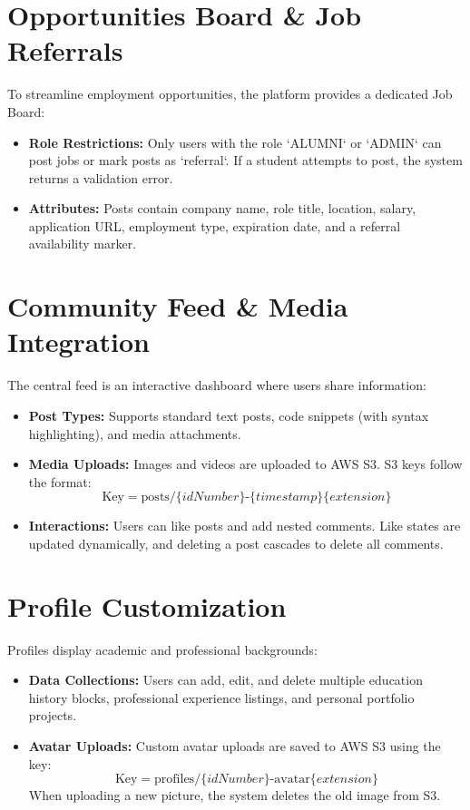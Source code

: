 \section{Opportunities Board \& Job Referrals}
To streamline employment opportunities, the platform provides a dedicated Job Board:
\begin{itemize}
    \item \textbf{Role Restrictions:} Only users with the role `ALUMNI` or `ADMIN` can post jobs or mark posts as `referral`. If a student attempts to post, the system returns a validation error.
    \item \textbf{Attributes:} Posts contain company name, role title, location, salary, application URL, employment type, expiration date, and a referral availability marker.
\end{itemize}

\section{Community Feed \& Media Integration}
The central feed is an interactive dashboard where users share information:
\begin{itemize}
    \item \textbf{Post Types:} Supports standard text posts, code snippets (with syntax highlighting), and media attachments.
    \item \textbf{Media Uploads:} Images and videos are uploaded to AWS S3. S3 keys follow the format:
    \begin{equation}
        \text{Key} = \text{posts/}\{idNumber\}\text{-}\{timestamp\}\{extension\}
    \end{equation}
    \item \textbf{Interactions:} Users can like posts and add nested comments. Like states are updated dynamically, and deleting a post cascades to delete all comments.
\end{itemize}

\section{Profile Customization}
Profiles display academic and professional backgrounds:
\begin{itemize}
    \item \textbf{Data Collections:} Users can add, edit, and delete multiple education history blocks, professional experience listings, and personal portfolio projects.
    \item \textbf{Avatar Uploads:} Custom avatar uploads are saved to AWS S3 using the key:
    \begin{equation}
        \text{Key} = \text{profiles/}\{idNumber\}\text{-avatar}\{extension\}
    \end{equation}
    When uploading a new picture, the system deletes the old image from S3.
\end{itemize}
